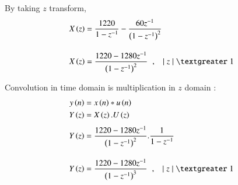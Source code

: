 \documentclass[journal,12pt,onecolumn]{IEEEtran}
\theoremstyle{remark}
\begin{document}
	By taking $z$ transform,
	\begin{align}
			X\brak z &= \dfrac{1220}{1 - z^{-1}} - \dfrac{60 z^{-1}}{\brak{1 - z^{-1}}^2} \\[10pt]
		X\brak z &= \dfrac{1220 - 1280 z^{-1}}{\brak{1 - z^{-1}}^2} \hspace{0.2cm}, \hspace{0.3cm}\lvert \hspace{0.1cm} z \hspace{0.1cm}\rvert \hspace{0.1cm} \textgreater \hspace{0.1cm} 1 
	\end{align}
	
	\vspace{0.3cm}
	
	Convolution in time domain is multiplication in $z$ domain :
	\begin{align}
		y\brak n &= x\brak n \ast u\brak n\\
		Y\brak z &= X\brak z . U\brak z\\[3pt]	
		Y\brak z &=  \dfrac{1220 - 1280 z^{-1}}{\brak{1 - z^{-1}}^2}.\dfrac{1}{1 - z^{-1}} \\[10pt]
		Y\brak z &= \dfrac{1220 - 1280 z^{-1}}{\brak{1 - z^{-1}}^3} \hspace{0.2cm}, \hspace{0.3cm}\lvert \hspace{0.1cm} z \hspace{0.1cm}\rvert \hspace{0.1cm} \textgreater \hspace{0.1cm} 1
	\end{align}
	
\end{document}
